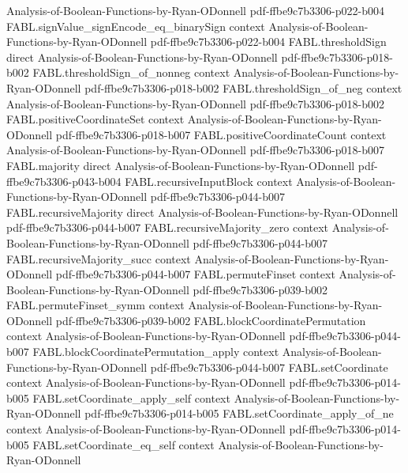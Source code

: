 \begin{theorem}
  {Analysis-of-Boolean-Functions-by-Ryan-ODonnell}
  {pdf-ffbe9c7b3306-p022-b004}
\proofstep
  {FABL.signValue_signEncode_eq_binarySign}
  {context}
  {Analysis-of-Boolean-Functions-by-Ryan-ODonnell}
  {pdf-ffbe9c7b3306-p022-b004}
\proofstep
  {FABL.thresholdSign}
  {direct}
  {Analysis-of-Boolean-Functions-by-Ryan-ODonnell}
  {pdf-ffbe9c7b3306-p018-b002}
\proofstep
  {FABL.thresholdSign_of_nonneg}
  {context}
  {Analysis-of-Boolean-Functions-by-Ryan-ODonnell}
  {pdf-ffbe9c7b3306-p018-b002}
\proofstep
  {FABL.thresholdSign_of_neg}
  {context}
  {Analysis-of-Boolean-Functions-by-Ryan-ODonnell}
  {pdf-ffbe9c7b3306-p018-b002}
\proofstep
  {FABL.positiveCoordinateSet}
  {context}
  {Analysis-of-Boolean-Functions-by-Ryan-ODonnell}
  {pdf-ffbe9c7b3306-p018-b007}
\proofstep
  {FABL.positiveCoordinateCount}
  {context}
  {Analysis-of-Boolean-Functions-by-Ryan-ODonnell}
  {pdf-ffbe9c7b3306-p018-b007}
\proofstep
  {FABL.majority}
  {direct}
  {Analysis-of-Boolean-Functions-by-Ryan-ODonnell}
  {pdf-ffbe9c7b3306-p043-b004}
\proofstep
  {FABL.recursiveInputBlock}
  {context}
  {Analysis-of-Boolean-Functions-by-Ryan-ODonnell}
  {pdf-ffbe9c7b3306-p044-b007}
\proofstep
  {FABL.recursiveMajority}
  {direct}
  {Analysis-of-Boolean-Functions-by-Ryan-ODonnell}
  {pdf-ffbe9c7b3306-p044-b007}
\proofstep
  {FABL.recursiveMajority_zero}
  {context}
  {Analysis-of-Boolean-Functions-by-Ryan-ODonnell}
  {pdf-ffbe9c7b3306-p044-b007}
\proofstep
  {FABL.recursiveMajority_succ}
  {context}
  {Analysis-of-Boolean-Functions-by-Ryan-ODonnell}
  {pdf-ffbe9c7b3306-p044-b007}
\proofstep
  {FABL.permuteFinset}
  {context}
  {Analysis-of-Boolean-Functions-by-Ryan-ODonnell}
  {pdf-ffbe9c7b3306-p039-b002}
\proofstep
  {FABL.permuteFinset_symm}
  {context}
  {Analysis-of-Boolean-Functions-by-Ryan-ODonnell}
  {pdf-ffbe9c7b3306-p039-b002}
\proofstep
  {FABL.blockCoordinatePermutation}
  {context}
  {Analysis-of-Boolean-Functions-by-Ryan-ODonnell}
  {pdf-ffbe9c7b3306-p044-b007}
\proofstep
  {FABL.blockCoordinatePermutation_apply}
  {context}
  {Analysis-of-Boolean-Functions-by-Ryan-ODonnell}
  {pdf-ffbe9c7b3306-p044-b007}
\proofstep
  {FABL.setCoordinate}
  {context}
  {Analysis-of-Boolean-Functions-by-Ryan-ODonnell}
  {pdf-ffbe9c7b3306-p014-b005}
\proofstep
  {FABL.setCoordinate_apply_self}
  {context}
  {Analysis-of-Boolean-Functions-by-Ryan-ODonnell}
  {pdf-ffbe9c7b3306-p014-b005}
\proofstep
  {FABL.setCoordinate_apply_of_ne}
  {context}
  {Analysis-of-Boolean-Functions-by-Ryan-ODonnell}
  {pdf-ffbe9c7b3306-p014-b005}
\proofstep
  {FABL.setCoordinate_eq_self}
  {context}
  {Analysis-of-Boolean-Functions-by-Ryan-ODonnell}

\end{theorem}

